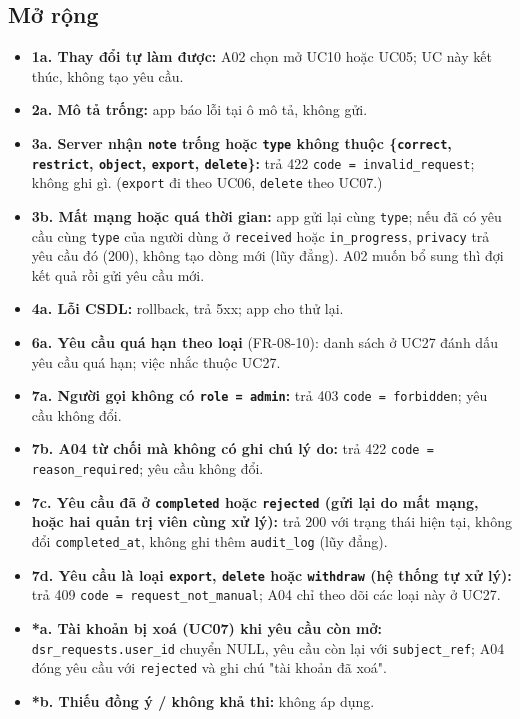 \subsection{Mở rộng}
\begin{itemize}
\item \textbf{1a. Thay đổi tự làm được:} A02 chọn mở UC10 hoặc UC05; UC này kết thúc, không tạo yêu cầu.
\item \textbf{2a. Mô tả trống:} app báo lỗi tại ô mô tả, không gửi.
\item \textbf{3a. Server nhận {\small\texttt{note}} trống hoặc {\small\texttt{type}} không thuộc \{{\small\texttt{correct}}, {\small\texttt{restrict}}, {\small\texttt{object}}, {\small\texttt{export}}, {\small\texttt{delete}}\}:} trả 422 {\small\texttt{code = invalid\_\allowbreak{}\allowbreak{}request}}; không ghi gì. ({\small\texttt{export}} đi theo UC06, {\small\texttt{delete}} theo UC07.)
\item \textbf{3b. Mất mạng hoặc quá thời gian:} app gửi lại cùng {\small\texttt{type}}; nếu đã có yêu cầu cùng {\small\texttt{type}} của người dùng ở {\small\texttt{received}} hoặc {\small\texttt{in\_\allowbreak{}\allowbreak{}progress}}, {\small\texttt{privacy}} trả yêu cầu đó (200), không tạo dòng mới (lũy đẳng). A02 muốn bổ sung thì đợi kết quả rồi gửi yêu cầu mới.
\item \textbf{4a. Lỗi CSDL:} rollback, trả 5xx; app cho thử lại.
\item \textbf{6a. Yêu cầu quá hạn theo loại} (FR-\allowbreak{}08-\allowbreak{}10): danh sách ở UC27 đánh dấu yêu cầu quá hạn; việc nhắc thuộc UC27.
\item \textbf{7a. Người gọi không có {\small\texttt{role = admin}}:} trả 403 {\small\texttt{code = forbidden}}; yêu cầu không đổi.
\item \textbf{7b. A04 từ chối mà không có ghi chú lý do:} trả 422 {\small\texttt{code = reason\_\allowbreak{}\allowbreak{}required}}; yêu cầu không đổi.
\item \textbf{7c. Yêu cầu đã ở {\small\texttt{completed}} hoặc {\small\texttt{rejected}} (gửi lại do mất mạng, hoặc hai quản trị viên cùng xử lý):} trả 200 với trạng thái hiện tại, không đổi {\small\texttt{completed\_\allowbreak{}\allowbreak{}at}}, không ghi thêm {\small\texttt{audit\_\allowbreak{}\allowbreak{}log}} (lũy đẳng).
\item \textbf{7d. Yêu cầu là loại {\small\texttt{export}}, {\small\texttt{delete}} hoặc {\small\texttt{withdraw}} (hệ thống tự xử lý):} trả 409 {\small\texttt{code = request\_\allowbreak{}\allowbreak{}not\_\allowbreak{}\allowbreak{}manual}}; A04 chỉ theo dõi các loại này ở UC27.
\item \textbf{*a. Tài khoản bị xoá (UC07) khi yêu cầu còn mở:} {\small\texttt{dsr\_\allowbreak{}\allowbreak{}requests.\allowbreak{}user\_\allowbreak{}\allowbreak{}id}} chuyển NULL, yêu cầu còn lại với {\small\texttt{subject\_\allowbreak{}\allowbreak{}ref}}; A04 đóng yêu cầu với {\small\texttt{rejected}} và ghi chú "tài khoản đã xoá".
\item \textbf{*b. Thiếu đồng ý /\allowbreak{} không khả thi:} không áp dụng.
\end{itemize}
